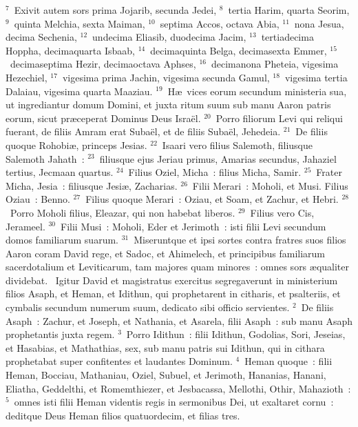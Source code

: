 ${}^{7}$~Exivit autem sors prima Jojarib, secunda Jedei,
${}^{8}$~tertia Harim, quarta Seorim,
${}^{9}$~quinta Melchia, sexta Maiman,
${}^{10}$~septima Accos, octava Abia,
${}^{11}$~nona Jesua, decima Sechenia,
${}^{12}$~undecima Eliasib, duodecima Jacim,
${}^{13}$~tertiadecima Hoppha, decimaquarta Isbaab,
${}^{14}$~decimaquinta Belga, decimasexta Emmer,
${}^{15}$~decimaseptima Hezir, decimaoctava Aphses,
${}^{16}$~decimanona Pheteia, vigesima Hezechiel,
${}^{17}$~vigesima prima Jachin, vigesima secunda Gamul,
${}^{18}$~vigesima tertia Dalaiau, vigesima quarta Maaziau.
${}^{19}$~H\ae\ vices eorum secundum ministeria sua, ut ingrediantur domum Domini, et juxta ritum suum sub manu Aaron patris eorum, sicut pr\ae ceperat Dominus Deus Isra\"el.
${}^{20}$~Porro filiorum Levi qui reliqui fuerant, de filiis Amram erat Suba\"el, et de filiis Suba\"el, Jehedeia.
${}^{21}$~De filiis quoque Rohobi\ae , princeps Jesias.
${}^{22}$~Isaari vero filius Salemoth, filiusque Salemoth Jahath~:
${}^{23}$~filiusque ejus Jeriau primus, Amarias secundus, Jahaziel tertius, Jecmaan quartus.
${}^{24}$~Filius Oziel, Micha~: filius Micha, Samir.
${}^{25}$~Frater Micha, Jesia~: filiusque Jesi\ae , Zacharias.
${}^{26}$~Filii Merari~: Moholi, et Musi. Filius Oziau~: Benno.
${}^{27}$~Filius quoque Merari~: Oziau, et Soam, et Zachur, et Hebri.
${}^{28}$~Porro Moholi filius, Eleazar, qui non habebat liberos.
${}^{29}$~Filius vero Cis, Jerameel.
${}^{30}$~Filii Musi~: Moholi, Eder et Jerimoth~: isti filii Levi secundum domos familiarum suarum.
${}^{31}$~Miseruntque et ipsi sortes contra fratres suos filios Aaron coram David rege, et Sadoc, et Ahimelech, et principibus familiarum sacerdotalium et Leviticarum, tam majores quam minores~: omnes sors \ae qualiter dividebat.
~\lettrine[lines=10,image=true,loversize=0.05,lraise=-0.03]{I}{}gitur David et magistratus exercitus segregaverunt in ministerium filios Asaph, et Heman, et Idithun, qui prophetarent in citharis, et psalteriis, et cymbalis secundum numerum suum, dedicato sibi officio servientes.
${}^{2}$~De filiis Asaph~: Zachur, et Joseph, et Nathania, et Asarela, filii Asaph~: sub manu Asaph prophetantis juxta regem.
${}^{3}$~Porro Idithun~: filii Idithun, Godolias, Sori, Jeseias, et Hasabias, et Mathathias, sex, sub manu patris sui Idithun, qui in cithara prophetabat super confitentes et laudantes Dominum.
${}^{4}$~Heman quoque~: filii Heman, Bocciau, Mathaniau, Oziel, Subuel, et Jerimoth, Hananias, Hanani, Eliatha, Geddelthi, et Romemthiezer, et Jesbacassa, Mellothi, Othir, Mahazioth~:
${}^{5}$~omnes isti filii Heman videntis regis in sermonibus Dei, ut exaltaret cornu~: deditque Deus Heman filios quatuordecim, et filias tres.
